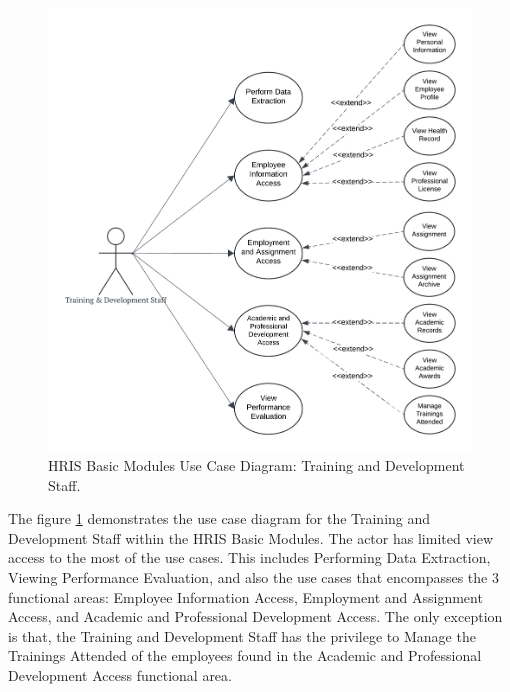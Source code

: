     \begin{figure}[H]
        \centering
        \includegraphics[width=0.9\linewidth]{figures/images/diagrams/usecase/use-case-basic-5.png}
        \caption{HRIS Basic Modules Use Case Diagram: Training and Development Staff.}
        \label{fig:use-case-basic-5}
    \end{figure}
    
    The figure \ref{fig:use-case-basic-5} demonstrates the use case diagram for the Training and Development Staff within the HRIS Basic Modules. The actor has limited view access to the most of the use cases. This includes Performing Data Extraction, Viewing Performance Evaluation, and also the use cases that  encompasses the 3 functional areas: Employee Information Access, Employment and Assignment Access, and Academic and Professional Development Access. The only exception is that, the Training and Development Staff has the privilege to Manage the Trainings Attended of the employees found in the Academic and Professional Development Access functional area.

